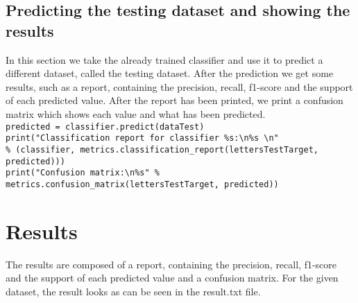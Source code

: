 \documentclass[a4paper,10pt]{report}
\newcommand{\code}[1]{\colorbox{light-gray}{\texttt{#1}}}
\begin{document}
 \subsection{Predicting the testing dataset and showing the results}
 In this section we take the already trained classifier and use it to predict a different dataset, called the testing dataset. After the prediction we get some results, such as a report, containing the precision, recall, f1-score and the support of each predicted value. After the report has been printed, we print a confusion matrix which shows each value and what has been predicted.\\
 \code{predicted = classifier.predict(dataTest)}\\
 \code{print("Classification report for classifier \%s:\textbackslash n\%s \textbackslash n"}\\
 \code{\% (classifier, metrics.classification\_report(lettersTestTarget, predicted)))}\\
 \code{print("Confusion matrix:\textbackslash n\%s" \% metrics.confusion\_matrix(lettersTestTarget, predicted))}\\
 
 \section{Results}
 The results are composed of a report, containing the precision, recall, f1-score and the support of each predicted value and a confusion matrix. For the given dataset, the result looks as can be seen in the result.txt file.\\
 
 
 
\end{document}
